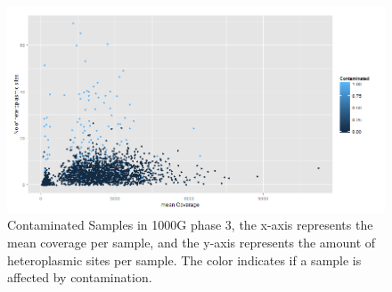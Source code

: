 \begin{figure}[!ht]
    \centering
    \includegraphics[width=1\textwidth]{images/contamination1000g.png}
    \caption[Contaminated Samples in 1000G phase 3]{Contaminated Samples in 1000G phase 3, the x-axis represents the mean coverage per sample, and the y-axis represents the amount of heteroplasmic sites per sample. The color indicates if a sample is affected by contamination.} 
    \label{cont:1000G}
\end{figure}
